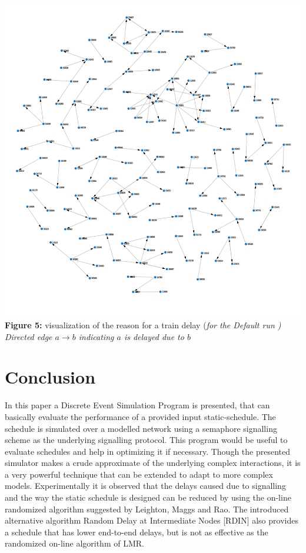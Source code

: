 \documentclass[twoside,11pt]{article}
\newenvironment{changemargin}[2]{%
\begin{list}{}{%
\setlength{\topsep}{0pt}%
\setlength{\leftmargin}{#1}%
\setlength{\rightmargin}{#2}%
\setlength{\listparindent}{\parindent}%
\setlength{\itemindent}{\parindent}%
\setlength{\parsep}{\parskip}%
}%
\item[]}{\end{list}}
\begin{document}
\newpage 
\begin{changemargin}{-3cm}{-3cm}
\begin{center}
	\includegraphics[scale=0.93]{img/train_delay_reason.png} \\
	\textbf{Figure 5:} visualization of the reason for a train delay ({\em for the Default run )} \\ {\em Directed edge $a \to b$ indicating $a$ is delayed due to $b$}\\
	
\end{center}
\end{changemargin}

\newpage

\section{Conclusion}

In this paper a Discrete Event Simulation Program is presented, that can basically evaluate the performance of a provided input static-schedule. The schedule is simulated over a modelled network using a semaphore signalling scheme as the underlying signalling protocol. This program would be useful to evaluate schedules and help in optimizing it if necessary. Though the presented simulator makes a crude approximate of the underlying complex interactions, it is a very powerful technique that can be extended to adapt to more complex models. Experimentally it is observed that the delays caused due to signalling and the way the static schedule is designed can be reduced by using the on-line randomized algorithm suggested by Leighton, Maggs and Rao. The introduced alternative algorithm Random Delay at Intermediate Nodes [RDIN] also provides a schedule that has lower end-to-end delays, but is not as effective as the randomized on-line algorithm of LMR. \\
\end{document}
